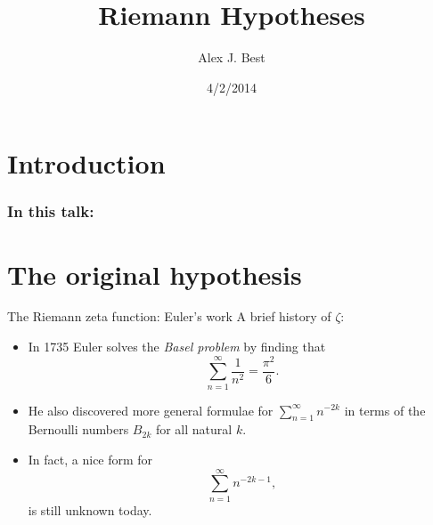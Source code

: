 \documentclass{beamer}
\author{Alex J. Best}
\institute{WMS Talks}
\date{4/2/2014}
\title{Riemann Hypotheses}
\begin{document}
\section{Introduction}

\frame{\titlepage}

\begin{frame}
\frametitle{In this talk:}
\tableofcontents
{} %
\end{frame}

\section{The original hypothesis}

\begin{frame}{The Riemann zeta function: Euler's work}
A brief history of $\zeta$:
\begin{itemize}
\item In 1735 Euler solves the \emph{Basel problem} by finding that
\[\sum_{n=1}^{\infty} \frac{1}{n^2} = \frac{\pi^2}{6}.\]
\pause \item He also discovered more general formulae for $\sum_{n=1}^{\infty} n^{-2k}$ in terms of the Bernoulli numbers $B_{2k}$ for all natural $k$.
\pause \item In fact, a nice form for \[\sum_{n=1}^{\infty} n^{-2k-1},\] is still unknown today.
\end{itemize}
\end{frame}
\end{document}
